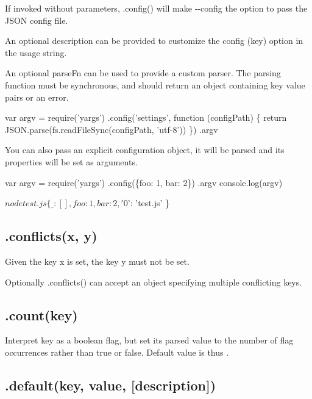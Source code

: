 If invoked without parameters, {\ttfamily .config()} will make {\ttfamily -\/-\/config} the option to pass the J\+S\+ON config file.

An optional {\ttfamily description} can be provided to customize the config ({\ttfamily key}) option in the usage string.

An optional {\ttfamily parse\+Fn} can be used to provide a custom parser. The parsing function must be synchronous, and should return an object containing key value pairs or an error.


\begin{DoxyCode}
var argv = require('yargs')
  .config('settings', function (configPath) \{
    return JSON.parse(fs.readFileSync(configPath, 'utf-8'))
  \})
  .argv
\end{DoxyCode}


You can also pass an explicit configuration {\ttfamily object}, it will be parsed and its properties will be set as arguments.


\begin{DoxyCode}
var argv = require('yargs')
  .config(\{foo: 1, bar: 2\})
  .argv
console.log(argv)
\end{DoxyCode}



\begin{DoxyCode}
$ node test.js
\{ \_: [],
  foo: 1,
  bar: 2,
  '$0': 'test.js' \}
\end{DoxyCode}


\subsection*{\label{_conflicts}%
.conflicts(x, y) }

Given the key {\ttfamily x} is set, the key {\ttfamily y} must not be set.

Optionally {\ttfamily .conflicts()} can accept an object specifying multiple conflicting keys.

\subsection*{\label{_count}%
.count(key) }

Interpret {\ttfamily key} as a boolean flag, but set its parsed value to the number of flag occurrences rather than {\ttfamily true} or {\ttfamily false}. Default value is thus {}.

\subsection*{\label{_default}%
.default(key, value, \mbox{[}description\mbox{]}) }


